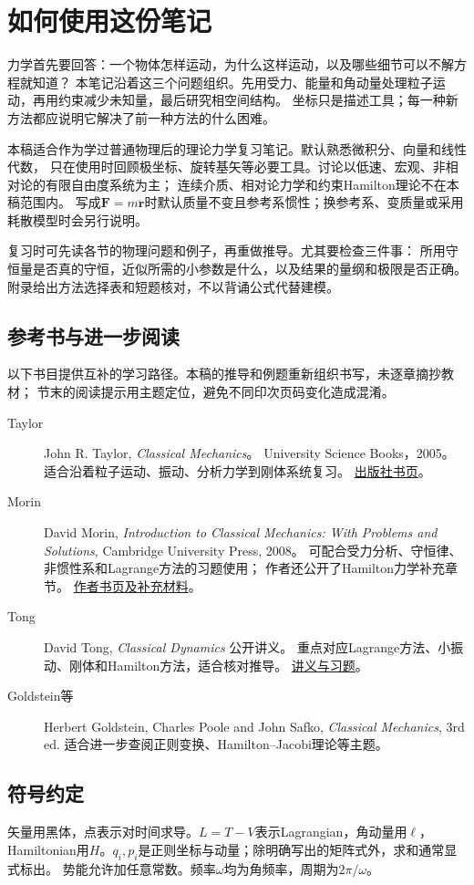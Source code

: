 \chapter*{如何使用这份笔记}

力学首先要回答：一个物体怎样运动，为什么这样运动，以及哪些细节可以不解方程就知道？
本笔记沿着这三个问题组织。先用受力、能量和角动量处理粒子运动，再用约束减少未知量，最后研究相空间结构。
坐标只是描述工具；每一种新方法都应说明它解决了前一种方法的什么困难。

本稿适合作为学过普通物理后的理论力学复习笔记。默认熟悉微积分、向量和线性代数，
只在使用时回顾极坐标、旋转基矢等必要工具。讨论以低速、宏观、非相对论的有限自由度系统为主；
连续介质、相对论力学和约束Hamilton理论不在本稿范围内。
写成$\bm F = m\ddot{\bm r}$时默认质量不变且参考系惯性；换参考系、变质量或采用耗散模型时会另行说明。

复习时可先读各节的物理问题和例子，再重做推导。尤其要检查三件事：
所用守恒量是否真的守恒，近似所需的小参数是什么，以及结果的量纲和极限是否正确。
附录给出方法选择表和短题核对，不以背诵公式代替建模。

\section*{参考书与进一步阅读}
以下书目提供互补的学习路径。本稿的推导和例题重新组织书写，未逐章摘抄教材；
节末的阅读提示用主题定位，避免不同印次页码变化造成混淆。
\begin{description}
  \item[Taylor]
  John R. Taylor, \emph{Classical Mechanics}。
  University Science Books，2005。
  适合沿着粒子运动、振动、分析力学到刚体系统复习。
  \href{https://uscibooks.aip.org/books/classical-mechanics/}{出版社书页}。
  \item[Morin]
  David Morin, \emph{Introduction to Classical Mechanics: With Problems and Solutions},
  Cambridge University Press, 2008。
  可配合受力分析、守恒律、非惯性系和Lagrange方法的习题使用；
  作者还公开了Hamilton力学补充章节。
  \href{https://davidmorin.physics.fas.harvard.edu/books/classical-mechanics}{作者书页及补充材料}。
  \item[Tong]
  David Tong, \emph{Classical Dynamics} 公开讲义。
  重点对应Lagrange方法、小振动、刚体和Hamilton方法，适合核对推导。
  \href{https://davidtong.org/teaching/classical-dynamics/}{讲义与习题}。
  \item[Goldstein等]
  Herbert Goldstein, Charles Poole and John Safko, \emph{Classical Mechanics}, 3rd ed.
  适合进一步查阅正则变换、Hamilton--Jacobi理论等主题。
\end{description}

\section*{符号约定}
矢量用黑体，点表示对时间求导。$L = T - V$表示Lagrangian，角动量用$\bm\ell$，
Hamiltonian用$H$。$q_i,p_i$是正则坐标与动量；除明确写出的矩阵式外，求和通常显式标出。
势能允许加任意常数。频率$\omega$均为角频率，周期为$2\pi/\omega$。
